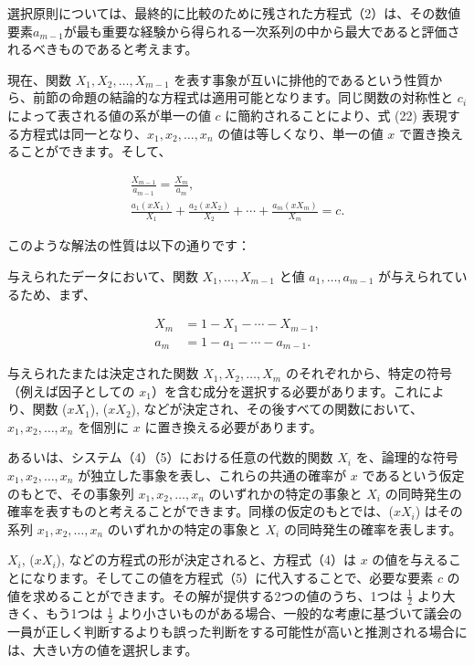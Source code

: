 \documentclass[a4paper,11pt,openany]{ltjsbook}
\begin{document}
選択原則については、最終的に比較のために残された方程式（2）は、その数値要素$a_{m-1}$が最も重要な経験から得られる一次系列の中から最大であると評価されるべきものであると考えます。

現在、関数 $X_1, X_2, \dots, X_{m-1}$ を表す事象が互いに排他的であるという性質から、前節の命題の結論的な方程式は適用可能となります。同じ関数の対称性と $c_i$ によって表される値の系が単一の値 $c$ に簡約されることにより、式 (22) 表現する方程式は同一となり、$x_1, x_2, \dots, x_n$ の値は等しくなり、単一の値 $x$ で置き換えることができます。そして、

\begin{gather*}
  \frac{X_{m-1}}{a_{m-1}} = \frac{X_m}{a_m},   \tag{4} \\
  \frac{a_1(x X_1)}{X_1} + \frac{a_2(x X_2)}{X_2} + \dotsb + \frac{a_m(x X_m)}{X_m} = c.                  \tag{5}
\end{gather*}

このような解法の性質は以下の通りです：

与えられたデータにおいて、関数 $X_1, \dots, X_{m-1}$ と値 $a_1, \dots, a_{m-1}$ が与えられているため、まず、

\begin{align*}
  X_m &= 1 - X_1 - \dotsb - X_{m-1}, \\
  a_m &= 1 - a_1 - \dotsb - a_{m-1}.
\end{align*}

与えられたまたは決定された関数 $X_1, X_2, \dotsc, X_m$ のそれぞれから、特定の符号（例えば因子としての $x_1$）を含む成分を選択する必要があります。これにより、関数 ($x X_1$), ($x X_2$), などが決定され、その後すべての関数において、$x_1, x_2, \dotsc, x_n$ を個別に $x$ に置き換える必要があります。

あるいは、システム（4）（5）における任意の代数的関数 $X_i$ を、論理的な符号 $x_1, x_2, \dotsc, x_n$ が独立した事象を表し、これらの共通の確率が $x$ であるという仮定のもとで、その事象列 $x_1, x_2, \dotsc, x_n$ のいずれかの特定の事象と $X_i$ の同時発生の確率を表すものと考えることができます。同様の仮定のもとでは、($x X_i$) はその系列 $x_1, x_2, \dotsc, x_n$ のいずれかの特定の事象と $X_i$ の同時発生の確率を表します。

$X_i$, ($x X_i$), などの方程式の形が決定されると、方程式（4）は $x$ の値を与えることになります。そしてこの値を方程式（5）に代入することで、必要な要素 $c$ の値を求めることができます。その解が提供する2つの値のうち、1つは $\frac{1}{2}$ より大きく、もう1つは $\frac{1}{2}$ より小さいものがある場合、一般的な考慮に基づいて議会の一員が正しく判断するよりも誤った判断をする可能性が高いと推測される場合には、大きい方の値を選択します。
\end{document}
